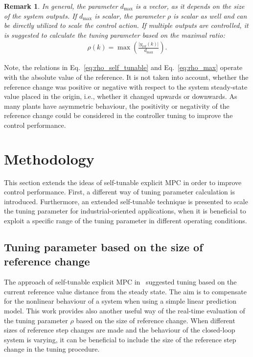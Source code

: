 \documentclass[preprint,12pt]{elsarticle}
\newtheorem{remark}[theorem]{Remark}
\begin{document}
	\begin{remark}
		In general, the parameter $d_{\max}$ is a vector, as it depends on the size of the system outputs. If $d_{\max}$ is scalar, the parameter $\rho$ is scalar as well and can be directly utilized to scale the control action. If multiple outputs are controlled, it is suggested to calculate the tuning parameter based on the maximal ratio:
		\begin{eqnarray}
			\label{eq:rho_max}
			\rho(k) = \max \left( \frac{\vert y_{\mathrm{ref}}(k) \vert}{d_{\max}} \right).
		\end{eqnarray}
	\end{remark}
	
	Note, the relations in Eq.~\eqref{eq:rho_self_tunable} and Eq.~\eqref{eq:rho_max} operate with the absolute value of the reference. It is not taken into account, whether the reference change was positive or negative with respect to the system steady-state value placed in the origin, i.e., whether it changed upwards or downwards. As many plants have asymmetric behaviour, the positivity or negativity of the reference change could be considered in the controller tuning to improve the control performance.
	
	
	\section{Methodology}
	\label{sec:methodology}
	This section extends the ideas of self-tunable explicit MPC in order to improve control performance. First, a different way of tuning parameter calculation is introduced. Furthermore, an extended self-tunable technique is presented to scale the tuning parameter for industrial-oriented applications, when it is beneficial to exploit a specific range of the tuning parameter in different operating conditions. 
	
	
	\subsection{Tuning parameter based on the size of reference change}
	\label{sec:self_tunable_delta_ref}
	The approach of self-tunable explicit MPC in~\cite{self_tunable} suggested tuning based on the current reference value distance from the steady state. The aim is to compensate for the nonlinear behaviour of a system when using a simple linear prediction model. This work provides also another useful way of the real-time evaluation of the tuning parameter $\rho$ based on the size of reference change. When different sizes of reference step changes are made and the behaviour of the closed-loop system is varying, it can be beneficial to include the size of the reference step change in the tuning procedure.
	
\end{document}
